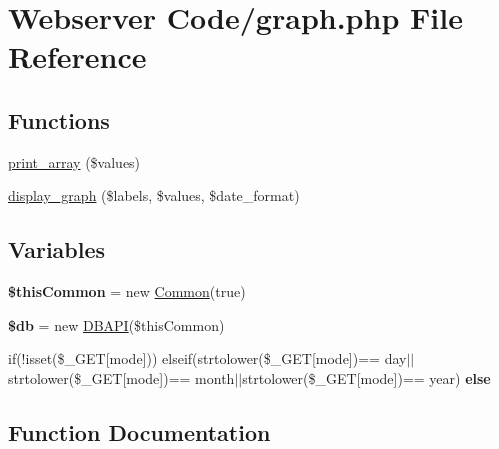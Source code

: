 \hypertarget{graph_8php}{}\section{Webserver Code/graph.php File Reference}
\label{graph_8php}
\subsection*{Functions}
\begin{DoxyCompactItemize}
\item 
\hyperlink{graph_8php_a7af48d7091d5a774294eae9ab84a5057}{print\+\_\+array} (\$values)
\item 
\hyperlink{graph_8php_af55d8d11c9641c2dd1b0b29a790b0fe8}{display\+\_\+graph} (\$labels, \$values, \$date\+\_\+format)
\end{DoxyCompactItemize}
\subsection*{Variables}
\begin{DoxyCompactItemize}
\item 
{\bfseries \$this\+Common} = new \hyperlink{class_common}{Common}(true)\hypertarget{graph_8php_a2dc37683cec5a169d791007363950944}{}\label{graph_8php_a2dc37683cec5a169d791007363950944}

\item 
{\bfseries \$db} = new \hyperlink{class_d_b_a_p_i}{D\+B\+A\+PI}(\$this\+Common)\hypertarget{graph_8php_a1fa3127fc82f96b1436d871ef02be319}{}\label{graph_8php_a1fa3127fc82f96b1436d871ef02be319}

\item 
if(!isset(\$\+\_\+\+G\+ET\mbox{[}\textquotesingle{}mode\textquotesingle{}\mbox{]})) elseif(strtolower(\$\+\_\+\+G\+ET\mbox{[}\textquotesingle{}mode\textquotesingle{}\mbox{]})== \textquotesingle{}day\textquotesingle{}$\vert$$\vert$strtolower(\$\+\_\+\+G\+ET\mbox{[}\textquotesingle{}mode\textquotesingle{}\mbox{]})== \textquotesingle{}month\textquotesingle{}$\vert$$\vert$strtolower(\$\+\_\+\+G\+ET\mbox{[}\textquotesingle{}mode\textquotesingle{}\mbox{]})== \textquotesingle{}year\textquotesingle{}) {\bfseries else}
\end{DoxyCompactItemize}


\subsection{Function Documentation}
